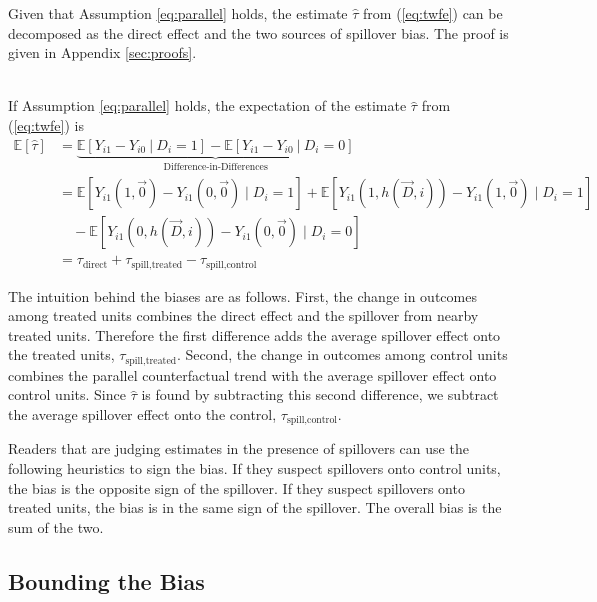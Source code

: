 \documentclass[11pt]{article}
\begin{document}
Given that Assumption \ref{eq:parallel} holds, the estimate $\hat{\tau}$ from (\ref{eq:twfe}) can be decomposed as the direct effect and the two sources of spillover bias. The proof is given in Appendix \ref{sec:proofs}.

\begin{proposition}\label{thm:bias}\ \\    
    If Assumption \ref{eq:parallel} holds, the expectation of the estimate $\hat{\tau}$ from (\ref{eq:twfe}) is
    \begin{align*}
        \mathbb{E}[\hat{\tau}] &= \underbrace{\mathbb{E}\left[ Y_{i1} - Y_{i0} \ \vert \ D_i = 1 \right] - \mathbb{E}\left[ Y_{i1} - Y_{i0} \ \vert \ D_i = 0 \right]}_{\text{Difference-in-Differences}} \\ 
        &= 
        \mathbb{E} \left[ Y_{i1}(1, \vec{0}) - Y_{i1}(0, \vec{0}) \mid D_i = 1 \right] + \mathbb{E} \left[ Y_{i1}(1, h(\vec{D}, i)) - Y_{i1}(1, \vec{0}) \mid D_i = 1 \right] \\
        &\quad - \mathbb{E} \left[ Y_{i1}(0, h(\vec{D}, i)) - Y_{i1}(0, \vec{0}) \mid D_i = 0 \right] \\
        &= \tau_{\text{direct}} + \tau_{\text{spill,treated}} - \tau_{\text{spill,control}}
    \end{align*}
\end{proposition}

The intuition behind the biases are as follows. First, the change in outcomes among treated units combines the direct effect and the spillover from nearby treated units. Therefore the first difference adds the average spillover effect onto the treated units, $\tau_{\text{spill,treated}}$. Second, the change in outcomes among control units combines the parallel counterfactual trend with the average spillover effect onto control units. Since $\hat{\tau}$ is found by subtracting this second difference, we subtract the average spillover effect onto the control, $\tau_{\text{spill,control}}$. 

Readers that are judging estimates in the presence of spillovers can use the following heuristics to sign the bias. If they suspect spillovers onto control units, the bias is the opposite sign of the spillover. If they suspect spillovers onto treated units, the bias is in the same sign of the spillover. The overall bias is the sum of the two.


\subsection{Bounding the Bias}
\end{document}
